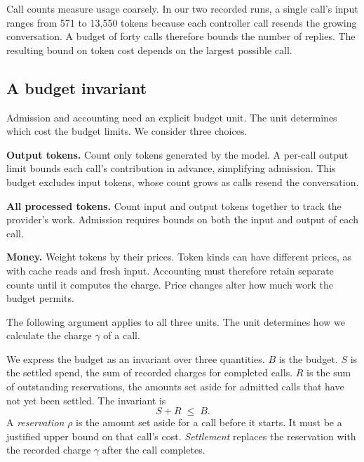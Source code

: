 Call counts measure usage coarsely. In our two recorded runs, a single call's input ranges from
571 to 13{,}550 tokens because each controller call resends the growing conversation. A budget of
forty calls therefore bounds the number of replies. The resulting bound on token cost depends
on the largest possible call.

\subsection{A budget invariant}
\label{sec:budgets-invariant}

Admission and accounting need an explicit budget unit. The unit determines which cost the budget
limits. We consider three choices.

\bi

\item \textbf{Output tokens.} Count only tokens generated by the model. A per-call output limit
bounds each call's contribution in advance, simplifying admission. This budget excludes input
tokens, whose count grows as calls resend the conversation.

\item \textbf{All processed tokens.} Count input and output tokens together to track the provider's
work. Admission requires bounds on both the input and output of each call.

\item \textbf{Money.} Weight tokens by their prices. Token kinds can have different prices, as with
cache reads and fresh input. Accounting must therefore retain separate counts until it computes
the charge. Price changes alter how much work the budget permits.

\ei

\noindent The following argument applies to all three units. The unit determines how we calculate
the charge $\gamma$ of a call.

We express the budget as an invariant over three quantities. $B$ is the budget. $S$ is the settled
spend, the sum of recorded charges for completed calls. $R$ is the sum of outstanding reservations,
the amounts set aside for admitted calls that have not yet been settled. The invariant is
\[
  S + R \;\leq\; B .
\]
A \emph{reservation} $\rho$ is the amount set aside for a call before it starts. It must be a
justified upper bound on that call's cost. \emph{Settlement} replaces the reservation with the
recorded charge $\gamma$ after the call completes.

